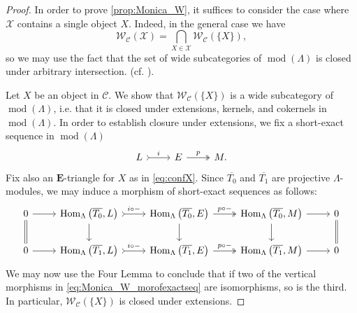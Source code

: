 \documentclass[10pt,twoside, a4paper,reqno]{amsart}
\DeclareMathOperator{\mods}{mod}
\DeclareMathOperator{\Hom}{Hom}
\newcommand{\calC}{\mathcal{C}}
\newcommand{\calW}{\mathcal{W}}
\newcommand{\E}{\mathbf{E}}
\theoremstyle{definition}
\begin{document}
\begin{proof}
    In order to prove \eqref{prop:Monica_W}, it suffices to consider the case where $\mathcal{X}$ contains a single object $X$. Indeed, in the general case we have
    \begin{equation}\label{eq:unionObj}
        \calW_{\calC}(\mathcal{X}) = \bigcap_{X\in\mathcal{X}} \calW_{\calC}(\{X\}),     
    \end{equation}
    so we may use the fact that the set of wide subcategories of $\mods(\Lambda)$ is closed under arbitrary intersection. {(cf. \cite[Proof of Prop. 3.14]{Gar23}).} 

    Let $X$ be an object in $\calC$. We show that $\calW_{\calC}(\{X\})$ is a wide subcategory of $\mods(\Lambda)$, i.e. that it is closed under extensions, kernels, and cokernels in $\mods(\Lambda)$. In order to establish closure under extensions, we fix a short-exact sequence in $\mods(\Lambda)$
    \begin{equation}\label{eq:Monica_W_exactseq}
        \begin{tikzcd}
            L \arrow[r,tail,"i"] & E \arrow[r,two heads,"p"] & M.
        \end{tikzcd}
    \end{equation}
    Fix also {an $\E$-triangle} for $X$ as in \eqref{eq:confX}. Since $\overline{T_0}$ and $\overline{T_1}$ are projective $\Lambda$-modules, we may induce a morphism of short-exact sequences as follows:
    \begin{equation}\label{eq:Monica_W_morofexactseq}
        \begin{tikzcd}
0 \arrow[r] \arrow[d, equal] & {\Hom_{\Lambda}\big(\overline{T_0},L\big)} \arrow[r, "i\circ -", tail] \arrow[d] & {\Hom_{\Lambda}\big(\overline{T_0},E\big)} \arrow[r, "p\circ -", two heads] \arrow[d] & {\Hom_{\Lambda}\big(\overline{T_0},M\big)} \arrow[d] \arrow[r] & 0 \arrow[d, equal] \\
0 \arrow[r]                    & {\Hom_{\Lambda}\big(\overline{T_1},L\big)} \arrow[r, "i\circ -", tail]           & {\Hom_{\Lambda}\big(\overline{T_1},E\big)} \arrow[r, "p\circ -", two heads]           & {\Hom_{\Lambda}\big(\overline{T_1},M\big)} \arrow[r]           & 0                   
\end{tikzcd}
    \end{equation}
    We may now use the Four Lemma \cite[{Lem.} I.3.2]{Mac67} to conclude that if two of the vertical morphisms in \eqref{eq:Monica_W_morofexactseq} are isomorphisms, so is the third. In particular, $\calW_{\calC}(\{X\})$ is closed under extensions.
    

\end{proof}
\end{document}
